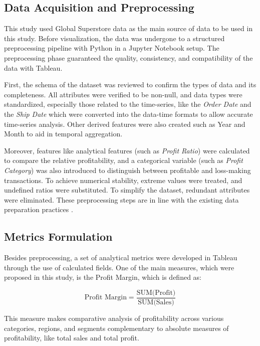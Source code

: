 \documentclass[conference]{IEEEtran}
\begin{document}
\subsection{Data Acquisition and Preprocessing}
This study used Global Superstore data as the main source of data to be used in this study. Before visualization, the data was undergone to a structured preprocessing pipeline with Python in a Jupyter Notebook setup. The preprocessing phase guaranteed the quality, consistency, and compatibility of the data with Tableau.

First, the schema of the dataset was reviewed to confirm the types of data and its completeness. All attributes were verified to be non-null, and data types were standardized, especially those related to the time-series, like the \textit{Order Date} and the \textit{Ship Date} which were converted into the data-time formats to allow accurate time-series analysis. Other derived features were also created such as Year and Month to aid in temporal aggregation.

Moreover, features like analytical features (such as \textit{Profit Ratio}) were calculated to compare the relative profitability, and a categorical variable (such as \textit{Profit Category}) was also introduced to distinguish between profitable and loss-making transactions. To achieve numerical stability, extreme values were treated, and undefined ratios were substituted. To simplify the dataset, redundant attributes were eliminated. These preprocessing steps are in line with the existing data preparation practices \cite{kotsiantis2007data, garcia2015data}.

\subsection{Metrics Formulation}

Besides preprocessing, a set of analytical metrics were developed in Tableau through the use of calculated fields. One of the main measures, which were proposed in this study, is the Profit Margin, which is defined as:

\begin{equation}
\text{Profit Margin} = \frac{\text{SUM(Profit)}}{\text{SUM(Sales)}}
\end{equation}

This measure makes comparative analysis of profitability across various categories, regions, and segments complementary to absolute measures of profitability, like total sales and total profit.
\end{document}
